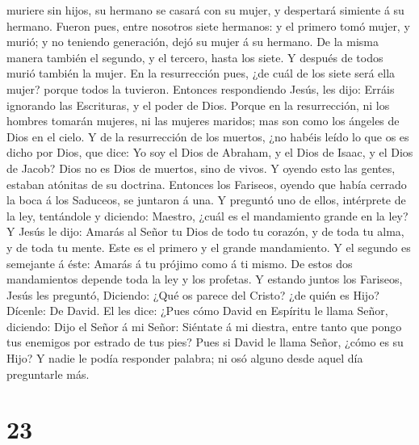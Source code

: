 muriere sin hijos, su hermano se casará con su mujer, y despertará
simiente á su hermano.  Fueron pues, entre nosotros siete
hermanos: y el primero tomó mujer, y murió; y no teniendo generación,
dejó su mujer á su hermano.  De la misma manera también
el segundo, y el tercero, hasta los siete.  Y después de
todos murió también la mujer.  En la resurrección pues,
¿de cuál de los siete será ella mujer? porque todos la tuvieron.
 Entonces respondiendo Jesús, les dijo: Erráis ignorando
las Escrituras, y el poder de Dios.  Porque en la
resurrección, ni los hombres tomarán mujeres, ni las mujeres maridos;
mas son como los ángeles de Dios en el cielo.  Y de la
resurrección de los muertos, ¿no habéis leído lo que os es dicho por
Dios, que dice:  Yo soy el Dios de Abraham, y el Dios de
Isaac, y el Dios de Jacob? Dios no es Dios de muertos, sino de vivos.
 Y oyendo esto las gentes, estaban atónitas de su
doctrina.  Entonces los Fariseos, oyendo que había
cerrado la boca á los Saduceos, se juntaron á una.  Y
preguntó uno de ellos, intérprete de la ley, tentándole y diciendo:
 Maestro, ¿cuál es el mandamiento grande en la ley?
 Y Jesús le dijo: Amarás al Señor tu Dios de todo tu
corazón, y de toda tu alma, y de toda tu mente.  Este es
el primero y el grande mandamiento.  Y el segundo es
semejante á éste: Amarás á tu prójimo como á ti mismo. 
De estos dos mandamientos depende toda la ley y los profetas.
 Y estando juntos los Fariseos, Jesús les preguntó,
 Diciendo: ¿Qué os parece del Cristo? ¿de quién es Hijo?
Dícenle: De David.  El les dice: ¿Pues cómo David en
Espíritu le llama Señor, diciendo:  Dijo el Señor á mi
Señor: Siéntate á mi diestra, entre tanto que pongo tus enemigos por
estrado de tus pies?  Pues si David le llama Señor, ¿cómo
es su Hijo?  Y nadie le podía responder palabra; ni osó
alguno desde aquel día preguntarle más.

\hypertarget{section-22}{%
\section{23}\label{section-22}}

